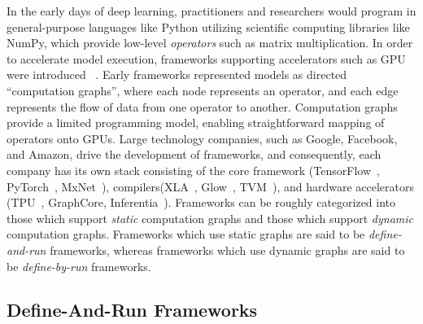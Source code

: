 In the early days of deep learning, practitioners and researchers would program
  in general-purpose languages like Python utilizing
  scientific computing libraries like NumPy,
  which provide low-level \textit{operators} such as matrix multiplication.
In order to accelerate model execution,
    frameworks supporting accelerators such as GPU were introduced~\cite{theano} .
Early frameworks represented models as directed ``computation graphs'',
    where each node represents an operator,
    and each edge represents the flow of data from one operator to another.
Computation graphs provide a limited programming model,
    enabling straightforward mapping of operators onto GPUs.
Large technology companies,
    such as Google, Facebook, and Amazon,
    drive the development of frameworks,
    and consequently,
    each company has its own stack consisting
    of the core framework (TensorFlow~\cite{tensorflow}, PyTorch~\cite{pytorch}, MxNet~\cite{mxnet}),
    compilers(XLA~\cite{xla}, Glow~\cite{glow}, TVM~\cite{tvm_osdi18}),
    and hardware accelerators (TPU~\cite{tpuv1}, GraphCore, Inferentia~\cite{inferentia}).
Frameworks can be roughly categorized into those which support \textit{static} computation graphs
  and those which support \textit{dynamic} computation graphs.
Frameworks which use static graphs are said to be \textit{define-and-run} frameworks,
  whereas frameworks which use dynamic graphs are said to be \textit{define-by-run} frameworks.

\subsection*{Define-And-Run Frameworks}

